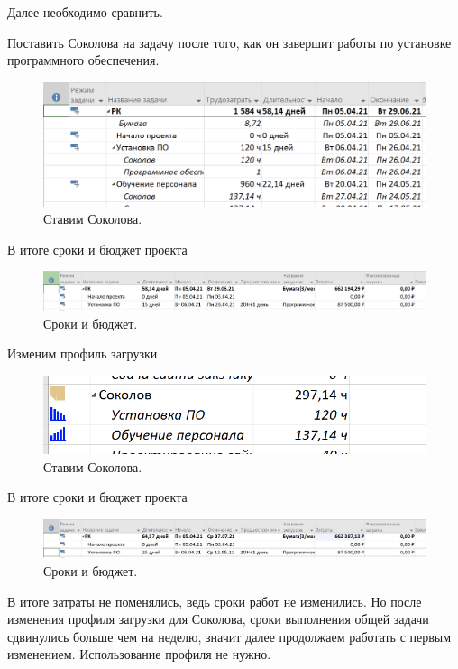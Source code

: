 \documentclass[a4paper,14pt]{extreport} %
\begin{document}
\begin{enumerate}
Далее необходимо сравнить.

Поставить Соколова на задачу после того, как он завершит работы по установке программного обеспечения.

\begin{figure}[H]
  \centering
  \caption{Ставим Соколова. }
  \includegraphics[scale=0.6]{12}
\end{figure}

В итоге сроки и бюджет проекта

\begin{figure}[H]
  \centering
  \caption{Сроки и бюджет. }
  \includegraphics[scale=0.6]{13}
\end{figure}

Изменим профиль загрузки

\begin{figure}[H]
  \centering
  \caption{Ставим Соколова. }
  \includegraphics[scale=0.6]{14}
\end{figure}

В итоге сроки и бюджет проекта

\begin{figure}[H]
  \centering
  \caption{Сроки и бюджет. }
  \includegraphics[scale=0.6]{15}
\end{figure}

В итоге затраты не поменялись, ведь сроки работ не изменились. Но после изменения профиля загрузки для Соколова, сроки выполнения общей задачи сдвинулись больше чем на неделю, значит далее продолжаем работать с первым изменением. Использование профиля не нужно.


\end{enumerate}
\end{document}
